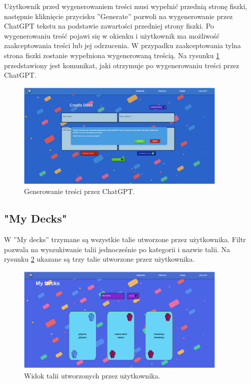 Użytkownik przed wygenerowaniem treści musi wypełnić przednią stronę fiszki, następnie kliknięcie przycisku ”Generate” pozwoli na wygenerowanie przez ChatGPT tekstu na podstawie zawartości przedniej strony fiszki. Po wygenerowaniu treść pojawi się w okienku i użytkownik ma możliwość zaakceptowania treści lub jej odrzucenia. W przypadku zaakceptowania tylna strona fiszki zostanie wypełniona wygenerowaną treścią. Na rysunku \ref{img:web_chat} przedstawiony jest komunikat, jaki otrzymuje po wygenerowaniu treści przez ChatGPT.


\begin{figure}[H]
    \centering
    \includegraphics[width=0.9\textwidth]{chapters/chapter_10/images_web/web_chat}
    \caption{Generowanie treści przez ChatGPT.}
    \label{img:web_chat}
\end{figure}


\subsection{"My Decks"}
W ”My decks” trzymane są wszystkie talie utworzone przez użytkownika. Filtr pozwala na wyszukiwanie talii jednocześnie po kategorii i nazwie talii. Na rysunku \ref{img:web_my_decks} ukazane są trzy talie utworzone przez użytkownika.



\begin{figure}[H]
    \centering
    \includegraphics[width=0.9\textwidth]{chapters/chapter_10/images_web/web_my_decks}
    \caption{Widok talii utworzonych przez użytkownika.}
    \label{img:web_my_decks}
\end{figure}


